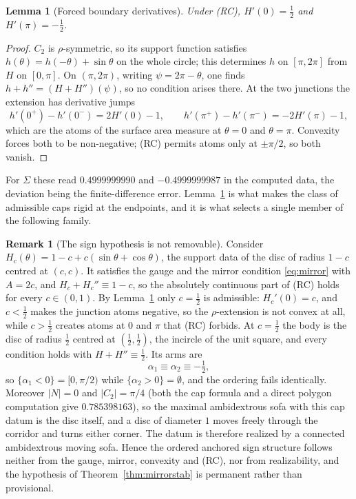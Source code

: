 \documentclass[11pt]{article}
\newtheorem{lemma}[theorem]{Lemma}
\theoremstyle{definition}
\newtheorem{remark}[theorem]{Remark}
\newcommand{\Sig}{\Sigma}
\begin{document}
\begin{lemma}[Forced boundary derivatives]\label{lem:bdry}
Under (RC), $H'(0)=\tfrac12$ and $H'(\pi)=-\tfrac12$.
\end{lemma}

\begin{proof}
$C_2$ is $\rho$-symmetric, so its support function satisfies $h(\theta)=h(-\theta)+\sin\theta$
on the whole circle; this determines $h$ on $[\pi,2\pi]$ from $H$ on $[0,\pi]$. On
$(\pi,2\pi)$, writing $\psi=2\pi-\theta$, one finds $h+h''=(H+H'')(\psi)$, so no condition
arises there. At the two junctions the extension has derivative jumps
\[
  h'(0^+)-h'(0^-)=2H'(0)-1,\qquad h'(\pi^+)-h'(\pi^-)=-2H'(\pi)-1 ,
\]
which are the atoms of the surface area measure at $\theta=0$ and $\theta=\pi$. Convexity
forces both to be non-negative; (RC) permits atoms only at $\pm\pi/2$, so both vanish.
\end{proof}

For $\Sig$ these read $0.4999999990$ and $-0.4999999987$ in the computed data, the
deviation being the finite-difference error. Lemma~\ref{lem:bdry} is what makes the class
of admissible caps rigid at the endpoints, and it is what selects a single member of the
following family.

\begin{remark}[The sign hypothesis is not removable]\label{rem:disc}
Consider $H_c(\theta)=1-c+c(\sin\theta+\cos\theta)$, the support data of the disc of
radius $1-c$ centred at $(c,c)$. It satisfies the gauge and the mirror condition
\eqref{eq:mirror} with $A=2c$, and $H_c+H_c''\equiv1-c$, so the absolutely continuous
part of (RC) holds for every $c\in(0,1)$. By Lemma~\ref{lem:bdry} only $c=\tfrac12$ is
admissible: $H_c'(0)=c$, and $c<\tfrac12$ makes the junction atoms negative, so the
$\rho$-extension is not convex at all, while $c>\tfrac12$ creates atoms at $0$ and $\pi$
that (RC) forbids. At $c=\tfrac12$ the body is the disc of radius $\tfrac12$ centred at
$(\tfrac12,\tfrac12)$, the incircle of the unit square, and every condition holds with
$H+H''\equiv\tfrac12$. Its arms are
\[
  \alpha_1\equiv\alpha_2\equiv-\tfrac12 ,
\]
so $\{\alpha_1<0\}=[0,\pi/2)$ while $\{\alpha_2>0\}=\emptyset$, and the ordering fails
identically. Moreover $|N|=0$ and $|C_2|=\pi/4$ (both the cap formula and a direct
polygon computation give $0.785398163$), so the maximal ambidextrous sofa with this cap
datum is the disc itself, and a disc of diameter $1$ moves freely through the corridor and
turns either corner. The datum is therefore realized by a connected ambidextrous moving
sofa. Hence the ordered anchored sign structure follows neither from the gauge, mirror,
convexity and (RC), nor from realizability, and the hypothesis of
Theorem~\ref{thm:mirrorstab} is permanent rather than provisional.
\end{remark}
\end{document}
